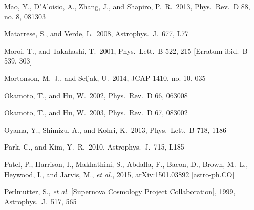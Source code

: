 \begin{thebibliography}{99}
\begin{multicols}{2}
{ 
  Mao, Y., D'Aloisio, A., Zhang, J., and Shapiro, P.~R.\ 2013,
  Phys.\ Rev.\ D 88, no. 8, 081303

  Matarrese, S., and Verde, L.\ 2008, 
  Astrophys.\ J.\ 677, L77

  Moroi, T., and Takahashi, T.\ 2001,
  Phys.\ Lett.\ B 522, 215
  [Erratum-ibid.\ B 539, 303]

  Mortonson, M.~J., and Seljak, U.\ 2014,
  JCAP 1410, no. 10, 035



  Okamoto, T., and Hu, W.\ 2002,
  Phys.\ Rev.\ D 66, 063008

  Okamoto, T., and Hu, W.\ 2003,
  Phys.\ Rev.\ D 67, 083002

  Oyama, Y., Shimizu, A., and Kohri, K.\ 2013,
  Phys.\ Lett.\ B 718, 1186


  Park, C., and Kim, Y.~R.\ 2010, 
  Astrophys.\ J.\ 715, L185

  Patel, P., Harrison, I., Makhathini, S., Abdalla, F., Bacon, D., Brown, M.~L., Heywood, I., and Jarvis, M., {\it et al.}, 2015,
  arXiv:1501.03892 [astro-ph.CO]

  Perlmutter, S., {\it et al.}  [Supernova Cosmology Project Collaboration], 1999,
  Astrophys.\ J.\ 517, 565

}
\end{multicols}
\end{thebibliography}
